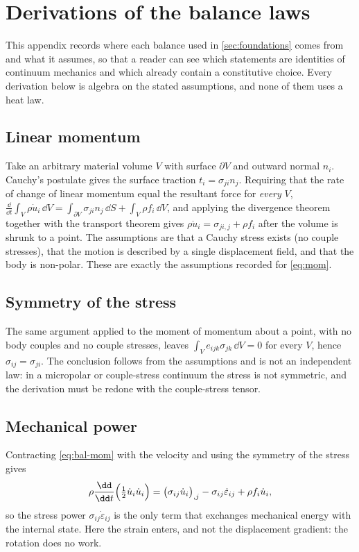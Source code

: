 \section{Derivations of the balance laws}\label{app:balance}

This appendix records where each balance used in \cref{sec:foundations} comes from and what it assumes, so that a reader can see which statements are identities of continuum mechanics and which already contain a constitutive choice. Every derivation below is algebra on the stated assumptions, and none of them uses a heat law.

\subsection*{Linear momentum}\label{eq:bal-mom}
Take an arbitrary material volume $V$ with surface $\partial V$ and outward normal $n_i$. Cauchy's
postulate gives the surface traction $t_i=\sigma_{ji}n_j$. Requiring that the rate of change of linear momentum
equal the resultant force for \emph{every} $V$,
$\frac{\dd}{\dd t}\int_V\rho\dot u_i\,\dd V=\int_{\partial V}\sigma_{ji}n_j\,\dd S+\int_V\rho f_i\,\dd V$,
and applying the divergence theorem together with the transport theorem gives
$\rho\ddot u_i=\sigma_{ji,j}+\rho f_i$ after the volume is shrunk to a point. The assumptions are that a Cauchy
stress exists (no couple stresses), that the motion is described by a single displacement field, and that the body is
non-polar. These are exactly the assumptions recorded for \eqref{eq:mom}.

\subsection*{Symmetry of the stress}\label{eq:bal-sym}
The same argument applied to the moment of momentum about a point, with no body couples and no couple
stresses, leaves $\int_V e_{ijk}\sigma_{jk}\,\dd V=0$ for every $V$, hence $\sigma_{ij}=\sigma_{ji}$. The
conclusion follows from the assumptions and is not an independent law: in a micropolar or couple-stress
continuum the stress is not symmetric, and the derivation must be redone with the couple-stress tensor.

\subsection*{Mechanical power}\label{eq:bal-power}
Contracting \eqref{eq:bal-mom} with the velocity and using the symmetry of the stress gives
\begin{equation}
\rho\frac{\dd}{\dd t}\Bigl(\tfrac12\dot u_i\dot u_i\Bigr)=\bigl(\sigma_{ij}\dot u_i\bigr)_{,j}
-\sigma_{ij}\dot\varepsilon_{ij}+\rho f_i\dot u_i ,
\end{equation}
so the stress power $\sigma_{ij}\dot\varepsilon_{ij}$ is the only term that exchanges mechanical energy with
the internal state. Here the strain enters, and not the displacement gradient: the rotation does no work.

